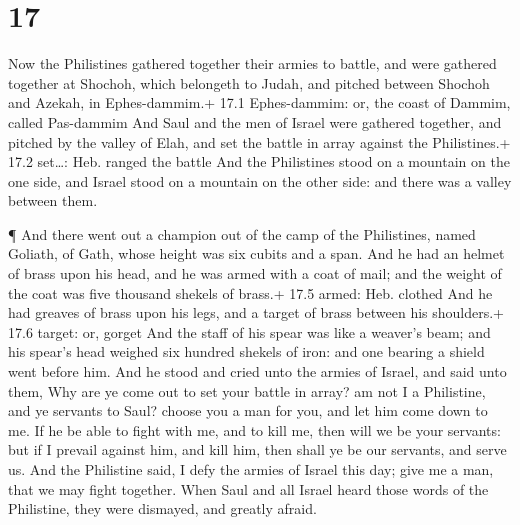 \hypertarget{section-16}{%
\section{17}\label{section-16}}

 Now the Philistines gathered together their armies to
battle, and were gathered together at Shochoh, which belongeth to Judah,
and pitched between Shochoh and Azekah, in Ephes-dammim.+ 17.1
Ephes-dammim: or, the coast of Dammim, called Pas-dammim 
And Saul and the men of Israel were gathered together, and pitched by
the valley of Elah, and set the battle in array against the
Philistines.+ 17.2 set\ldots: Heb. ranged the battle  And
the Philistines stood on a mountain on the one side, and Israel stood on
a mountain on the other side: and there was a valley between them.

 ¶ And there went out a champion out of the camp of the
Philistines, named Goliath, of Gath, whose height was six cubits and a
span.  And he had an helmet of brass upon his head, and he
was armed with a coat of mail; and the weight of the coat was five
thousand shekels of brass.+ 17.5 armed: Heb. clothed  And he
had greaves of brass upon his legs, and a target of brass between his
shoulders.+ 17.6 target: or, gorget  And the staff of his
spear was like a weaver's beam; and his spear's head weighed six hundred
shekels of iron: and one bearing a shield went before him. 
And he stood and cried unto the armies of Israel, and said unto them,
Why are ye come out to set your battle in array? am not I a Philistine,
and ye servants to Saul? choose you a man for you, and let him come down
to me.  If he be able to fight with me, and to kill me, then
will we be your servants: but if I prevail against him, and kill him,
then shall ye be our servants, and serve us.  And the
Philistine said, I defy the armies of Israel this day; give me a man,
that we may fight together.  When Saul and all Israel heard
those words of the Philistine, they were dismayed, and greatly afraid.

